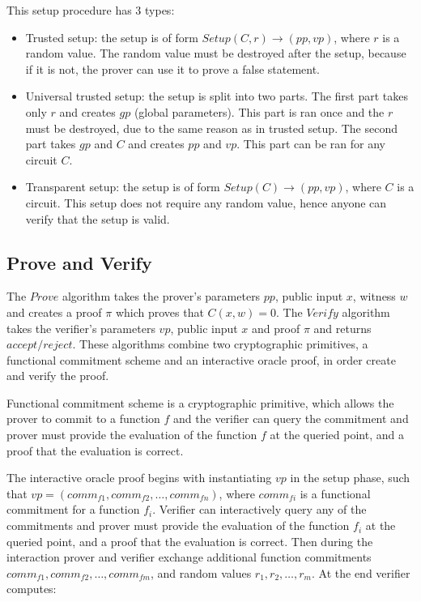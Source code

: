 This setup procedure has 3 types:

\begin{itemize}
	\item Trusted setup: the setup is of form $Setup(C, r) \rightarrow (pp, vp)$,
		where $r$ is a random value. The random value must be destroyed after
		the setup, because if it is not, the prover can use it to prove a false
		statement.
	\item Universal trusted setup: the setup is split into two parts. The first
		part takes only $r$ and creates $gp$ (global parameters). This part
		is ran once and the $r$ must be destroyed, due to the same reason as
		in trusted setup. The second part takes $gp$ and $C$ and creates
		$pp$ and $vp$. This part can be ran for any circuit $C$.
	\item Transparent setup: the setup is of form $Setup(C) \rightarrow (pp, vp)$,
		where $C$ is a circuit. This setup does not require any random value,
		hence anyone can verify that the setup is valid.
\end{itemize}

\subsection{Prove and Verify}

The $Prove$ algorithm takes the prover's parameters $pp$, public input $x$,
witness $w$ and creates a proof $\pi$ which proves that $C(x, w) = 0$. 
The $Verify$ algorithm takes the verifier's parameters $vp$, public input $x$ and
proof $\pi$ and returns $accept/reject$. These algorithms combine two
cryptographic primitives, a functional commitment scheme and an interactive
oracle proof, in order create and verify the proof.

Functional commitment scheme is a cryptographic primitive, which allows the
prover to commit to a function $f$ and the verifier can query the commitment and
prover must provide the evaluation of the function $f$ at the queried point,
and a proof that the evaluation is correct.

The interactive oracle proof begins with instantiating $vp$ in the setup phase, such that
$vp = (comm_{f1}, comm_{f2}, \dots, comm_{fn})$, where $comm_{fi}$ is a
functional commitment for a function $f_i$. Verifier can interactively query
any of the commitments and prover must provide the evaluation of the function
$f_i$ at the queried point, and a proof that the evaluation is correct.
Then during the interaction prover and verifier exchange additional function
commitments $comm_{f1}, comm_{f2}, \dots, comm_{fm}$, and random values $r_1, r_2, \dots, r_m$.
At the end verifier computes:

